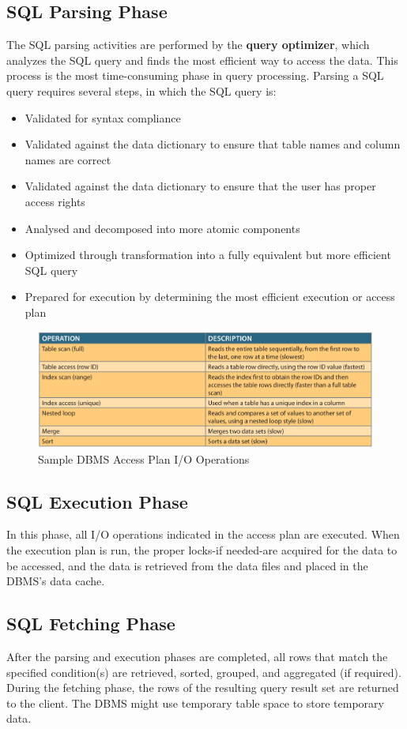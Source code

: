 \documentclass[a4paper, 11pt, titlepage]{report}
\begin{document}
\subsection{SQL Parsing Phase}
The SQL parsing activities are performed by the \textbf{query optimizer}, which analyzes the
SQL query and finds the most efficient way to access the data. This process is the most time-consuming phase in query processing. Parsing a SQL query requires several steps, in which the SQL query is:
\begin{itemize}
\item Validated for syntax compliance
\item Validated against the data dictionary to ensure that table names and column names are correct
\item Validated against the data dictionary to ensure that the user has proper access rights
\item Analysed and decomposed into more atomic components
\item Optimized through transformation into a fully equivalent but more efficient SQL query
\item Prepared for execution by determining the most efficient execution or access plan
\end{itemize}
\begin{figure}[H]
\centering
\includegraphics[scale=0.5]{pics/operations}
\caption{Sample DBMS Access Plan I/O Operations}
\end{figure}
\subsection{SQL Execution Phase}
In this phase, all I/O operations indicated in the access plan are executed. When the execution plan is run, the proper locks-if needed-are acquired for the data to be accessed, and the data is retrieved from the data files and placed in the DBMS's data cache.
\subsection{SQL Fetching Phase}
After the parsing and execution phases are completed, all rows that match the specified condition(s) are retrieved, sorted, grouped, and aggregated (if required). During the fetching phase, the rows of the resulting query result set are returned to the client. The DBMS might use temporary table space to store temporary data.
\end{document}

